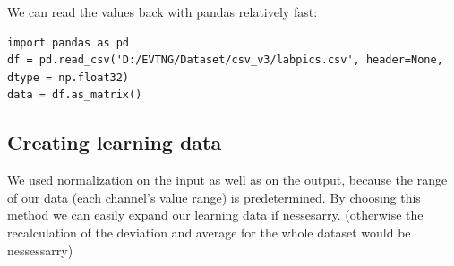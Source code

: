 \documentclass[12pt]{article}
\begin{document}
\noindent We can read the values back with pandas relatively fast:
\begin{lstlisting}
import pandas as pd
df = pd.read_csv('D:/EVTNG/Dataset/csv_v3/labpics.csv', header=None, dtype = np.float32)
data = df.as_matrix()
\end{lstlisting}
\subsection{Creating learning data}
We used normalization on the input as well as on the output, because the range of our data (each channel's value range) is predetermined. By choosing this method we can easily expand our learning data if nessesarry. (otherwise the recalculation of the deviation and average for the whole dataset would be nessessarry)
\end{document}
